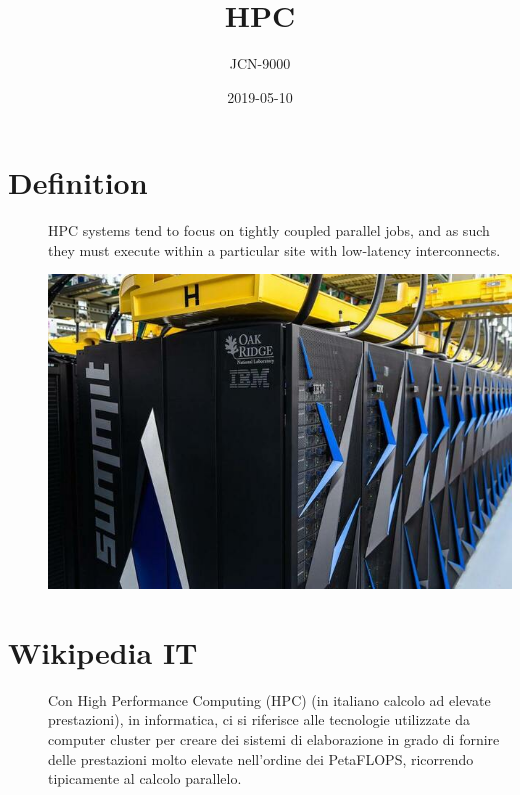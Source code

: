 \documentclass{article}
\title{HPC}
\author{JCN-9000}
\begin{document}
\date{2019-05-10}
\maketitle
\clearpage


\section*{Definition}

\begin{description}
\item[]

    HPC systems tend to focus on tightly coupled parallel jobs, and as
    such they must execute within a particular site with low-latency
    interconnects.

\includegraphics{images/Summit_small.jpg}
\end{description}

\section*{Wikipedia IT}

\begin{description}
\item[]

    Con High Performance Computing (HPC) (in italiano calcolo ad
    elevate prestazioni), in informatica, ci si riferisce alle
    tecnologie utilizzate da computer cluster per creare dei sistemi di
    elaborazione in grado di fornire delle prestazioni molto elevate
    nell'ordine dei PetaFLOPS, ricorrendo tipicamente al calcolo
    parallelo.
\end{description}
\end{document}
